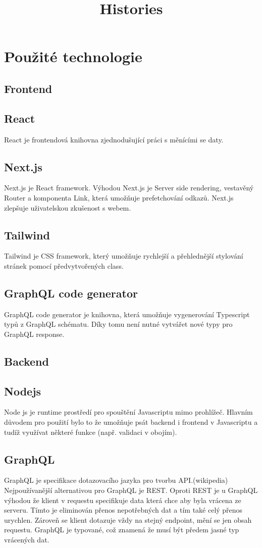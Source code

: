 \documentclass[12pt, a4paper,
 twoside,        %
 openright
]{report}
\title{Histories} %
\author{\name} %
\date{\publicationYear} %
\begin{document}
\pagestyle{empty}



% 
%  

\section{Použité technologie}
\subsection{Frontend}
\subsection{React}
React je frontendová knihovna zjednodušující práci s měnícími se daty.
\subsection{Next.js}
Next.js je React framework. Výhodou Next.js je Server side rendering, vestavěný Router a komponenta Link, která umožňuje prefetchování odkazů. Next.js zlepšuje uživatelskou zkušenost s webem.
\subsection{Tailwind}
Tailwind je CSS framework, který umožňuje rychlejší a přehlednější stylování stránek pomocí předvytvořených class.
\subsection{GraphQL code generator}
GraphQL code generator je knihovna, která umožňuje vygenerování Typescript typů z GraphQL schématu. Díky tomu není nutné vytvářet nové typy pro GraphQL response.
\subsection{Backend}
\subsection{Nodejs}
Node js je runtime prostředí pro spouštění Javascriptu mimo prohlížeč. Hlavním důvodem pro použití bylo to že umožňuje psát backend i frontend v Javascriptu a tudíž využívat některé funkce (např. validaci v obojím).
\subsection{GraphQL}
GraphQL je specifikace dotazovacího jazyka pro tvorbu API.(wikipedia) Nejpoužívanější alternativou pro GraphQL je REST. Oproti REST je u GraphQL výhodou že klient v requestu specifikuje data která chce aby byla vrácena ze serveru. Tímto je eliminován přenos nepotřebných dat a tím také celý přenos urychlen. Zároveň se klient dotazuje vždy na stejný endpoint, mění se jen obsah requestu. GraphQL je typované, což znamená že musí být předem jasné typ vrácených dat.
\end{document}
